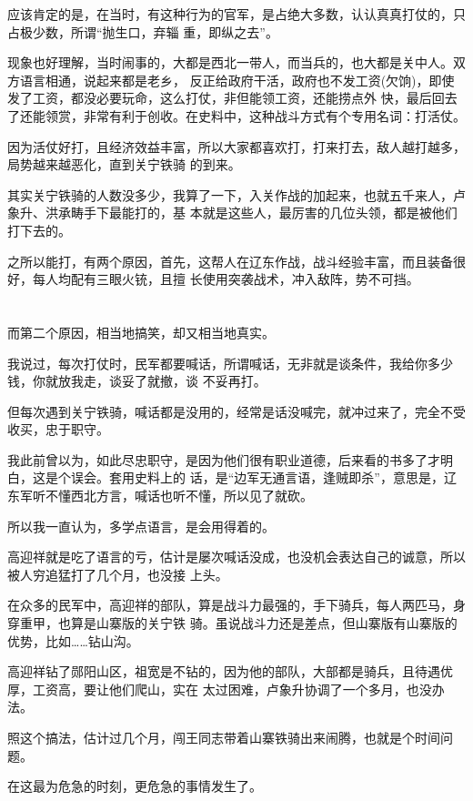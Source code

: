 \documentclass[11pt,a4paper,onecolumn]{article}
\begin{document}
应该肯定的是，在当时，有这种行为的官军，是占绝大多数，认认真真打仗的，只占极少数，所谓``抛生口，弃辎
重，即纵之去''。

现象也好理解，当时闹事的，大都是西北一带人，而当兵的，也大都是关中人。双方语言相通，说起来都是老乡，
反正给政府干活，政府也不发工资(欠饷)，即使发了工资，都没必要玩命，这么打仗，非但能领工资，还能捞点外
快，最后回去了还能领赏，非常有利于创收。在史料中，这种战斗方式有个专用名词：打活仗。

因为活仗好打，且经济效益丰富，所以大家都喜欢打，打来打去，敌人越打越多，局势越来越恶化，直到关宁铁骑
的到来。

其实关宁铁骑的人数没多少，我算了一下，入关作战的加起来，也就五千来人，卢象升、洪承畴手下最能打的，基
本就是这些人，最厉害的几位头领，都是被他们打下去的。

之所以能打，有两个原因，首先，这帮人在辽东作战，战斗经验丰富，而且装备很好，每人均配有三眼火铳，且擅
长使用突袭战术，冲入敌阵，势不可挡。

\section[\thesection]{}

而第二个原因，相当地搞笑，却又相当地真实。

我说过，每次打仗时，民军都要喊话，所谓喊话，无非就是谈条件，我给你多少钱，你就放我走，谈妥了就撤，谈
不妥再打。

但每次遇到关宁铁骑，喊话都是没用的，经常是话没喊完，就冲过来了，完全不受收买，忠于职守。

我此前曾以为，如此尽忠职守，是因为他们很有职业道德，后来看的书多了才明白，这是个误会。套用史料上的
话，是``边军无通言语，逢贼即杀''，意思是，辽东军听不懂西北方言，喊话也听不懂，所以见了就砍。

所以我一直认为，多学点语言，是会用得着的。

高迎祥就是吃了语言的亏，估计是屡次喊话没成，也没机会表达自己的诚意，所以被人穷追猛打了几个月，也没接
上头。

在众多的民军中，高迎祥的部队，算是战斗力最强的，手下骑兵，每人两匹马，身穿重甲，也算是山寨版的关宁铁
骑。虽说战斗力还是差点，但山寨版有山寨版的优势，比如……钻山沟。

高迎祥钻了郧阳山区，祖宽是不钻的，因为他的部队，大部都是骑兵，且待遇优厚，工资高，要让他们爬山，实在
太过困难，卢象升协调了一个多月，也没办法。

照这个搞法，估计过几个月，闯王同志带着山寨铁骑出来闹腾，也就是个时间问题。

在这最为危急的时刻，更危急的事情发生了。
\end{document}
